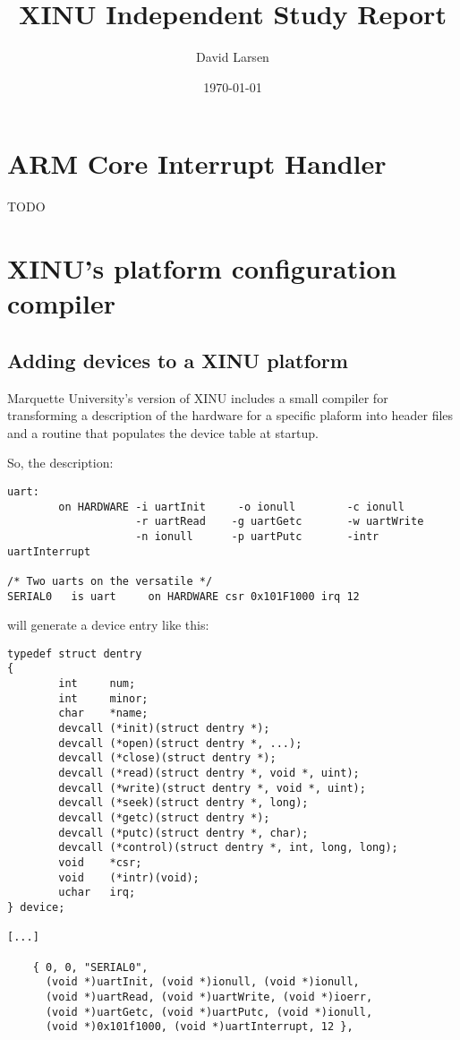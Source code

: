\documentclass[12pt]{article}
\title{XINU Independent Study Report}
\author{David Larsen}
\date{\today}
\newcommand{\TODO}[1]{{\huge\color{red}TODO \Large #1}}
\begin{document}
\maketitle

\tableofcontents

\section{ARM Core Interrupt Handler}

\TODO{}

\section{XINU's platform configuration compiler}

\subsection{Adding devices to a XINU platform}

Marquette University's version of XINU includes a small compiler for
transforming a description of the hardware for a specific plaform into header
files and a routine that populates the device table at startup.

So, the description:

\begin{verbatim}
uart:
        on HARDWARE -i uartInit     -o ionull        -c ionull
                    -r uartRead    -g uartGetc       -w uartWrite 
                    -n ionull      -p uartPutc       -intr uartInterrupt

/* Two uarts on the versatile */
SERIAL0   is uart     on HARDWARE csr 0x101F1000 irq 12
\end{verbatim}

will generate a device entry like this:

\begin{verbatim}
typedef struct dentry
{
        int     num;
        int     minor;
        char    *name;
        devcall (*init)(struct dentry *);
        devcall (*open)(struct dentry *, ...);
        devcall (*close)(struct dentry *);
        devcall (*read)(struct dentry *, void *, uint);
        devcall (*write)(struct dentry *, void *, uint);
        devcall (*seek)(struct dentry *, long);
        devcall (*getc)(struct dentry *);
        devcall (*putc)(struct dentry *, char);
        devcall (*control)(struct dentry *, int, long, long);
        void    *csr;
        void    (*intr)(void);
        uchar   irq;
} device;

[...]

	{ 0, 0, "SERIAL0",
	  (void *)uartInit, (void *)ionull, (void *)ionull,
	  (void *)uartRead, (void *)uartWrite, (void *)ioerr,
	  (void *)uartGetc, (void *)uartPutc, (void *)ionull,
	  (void *)0x101f1000, (void *)uartInterrupt, 12 },
\end{verbatim}
\end{document}
